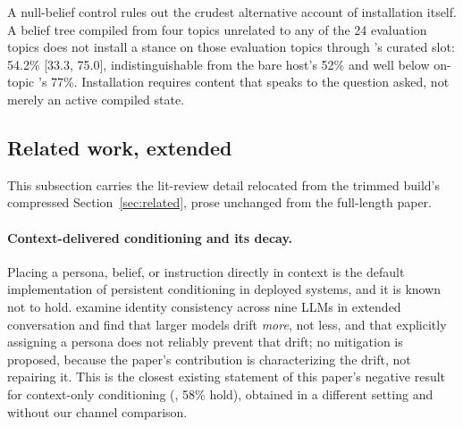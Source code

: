 A null-belief control rules out the crudest alternative account of installation
itself. A belief tree compiled from four topics unrelated to any of
the 24 evaluation topics does not install a stance on those evaluation topics through
\condF{}'s curated slot: 54.2\% [33.3, 75.0], indistinguishable from the bare host's 52\%
and well below on-topic \condF{}'s 77\%. Installation requires content that speaks to
the question asked, not merely an active compiled state.

\subsection{Related work, extended}
\label{app:related-extended}

This subsection carries the lit-review detail relocated from the trimmed build's
compressed Section~\ref{sec:related}, prose unchanged from the full-length paper.

\paragraph{Context-delivered conditioning and its decay.} Placing a persona, belief, or
instruction directly in context is the default implementation of persistent conditioning
in deployed systems, and it is known not to hold. \citet{choi2024identitydrift} examine
identity consistency across nine LLMs in extended conversation and find that larger
models drift \emph{more}, not less, and that explicitly assigning a persona does not
reliably prevent that drift; no mitigation is proposed, because the paper's contribution
is characterizing the drift, not repairing it. This is the closest existing statement of
this paper's negative result for context-only conditioning (\condB{}, 58\% hold),
obtained in a different setting and without our channel comparison.

